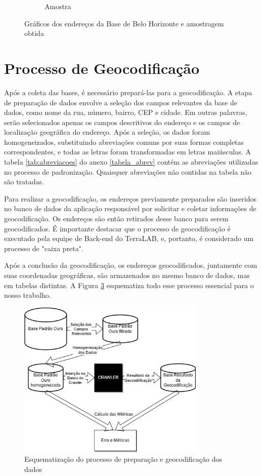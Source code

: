 \begin{figure}[ht]
\begin{subfigure}[b]{0.45\textwidth}
      \caption{Amostra}
      \label{fig:baseBhA}
    \end{subfigure}
    \caption{Gráficos dos endereços da Base de Belo Horizonte e amostragem obtida}
    \label{fig:baseBh}
\end{figure}

\section{Processo de Geocodificação}
\label{processoGeo}

Após a coleta das bases, é necessário prepará-las para a geocodificação. A etapa de preparação de dados envolve a seleção dos campos relevantes da base de dados, como nome da rua, número, bairro, CEP e cidade. Em outras palavras, serão selecionados apenas os campos descritivos do endereço e os campos de localização geográfica do endereço. Após a seleção, os dados foram homogeneizados, substituindo abreviações comuns por suas formas completas correspondentes, e todas as letras foram transformadas em letras maiúsculas. A tabela \ref{tab:abreviacoes} do anexo \ref{tabela_abrev} contém as abreviações utilizadas no processo de padronização. Quaisquer abreviações não contidas na tabela não são tratadas. 

Para realizar a geocodificação, os endereços previamente preparados são inseridos no banco de dados da aplicação responsável por solicitar e coletar informações de geocodificação. Os endereços são então retirados desse banco para serem geocodificados. É importante destacar que o processo de geocodificação é executado pela equipe de Back-end do TerraLAB, e, portanto, é considerado um processo de "caixa preta".

Após a conclusão da geocodificação, os endereços geocodificados, juntamente com suas coordenadas geográficas, são armazenados no mesmo banco de dados, mas em tabelas distintas. A Figura \ref{fig:diagramaMono} esquematiza todo esse processo essencial para o nosso trabalho.

\begin{figure}
    \centering
    \includegraphics[width=0.8\textwidth]{Figuras/diagrama monografia.drawio.png}
    \caption{Esquematização do processo de preparação e geocodificação dos dados}
    \label{fig:diagramaMono}
\end{figure}

